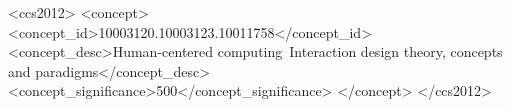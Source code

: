 \documentclass[sigconf, nonacm]{acmart}
\begin{document}
\begin{CCSXML}
<ccs2012>
   <concept>
       <concept_id>10003120.10003123.10011758</concept_id>
       <concept_desc>Human-centered computing~Interaction design theory, concepts and paradigms</concept_desc>
       <concept_significance>500</concept_significance>
       </concept>
 </ccs2012>
\end{CCSXML}




\maketitle









\end{document}
